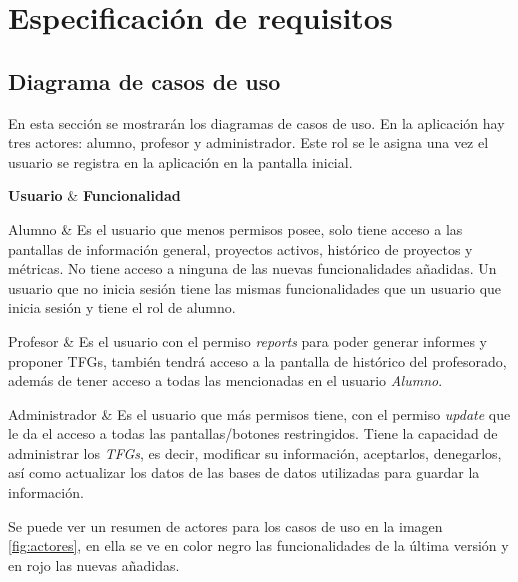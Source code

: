 \section{Especificación de requisitos}

\subsection{Diagrama de casos de uso}
En esta sección se mostrarán los diagramas de casos de uso. En la aplicación hay tres actores: alumno, profesor y administrador.
Este rol se le asigna una vez el usuario se registra en la aplicación en la pantalla inicial. 


{\textbf{Usuario} & \textbf{Funcionalidad} \\}{
	Alumno & Es el usuario que menos permisos posee, solo tiene acceso a las pantallas de información general, proyectos activos, histórico de proyectos y métricas. No tiene acceso a ninguna de las nuevas funcionalidades añadidas. Un usuario que no inicia sesión tiene las mismas funcionalidades que un usuario que inicia sesión y tiene el rol de alumno. \\\hline
	
	Profesor & Es el usuario con el permiso \emph{reports} para poder generar informes y proponer TFGs, también tendrá acceso a la pantalla de histórico del profesorado, además de tener acceso a todas las mencionadas en el usuario \emph{Alumno}. \\\hline
	
	Administrador & Es el usuario que más permisos tiene, con el permiso \emph{update} que le da el acceso a todas las pantallas/botones restringidos. Tiene la capacidad de administrar los \emph{TFGs}, es decir, modificar su información, aceptarlos, denegarlos, así como actualizar los datos de las bases de datos utilizadas para guardar la información. \\
}
Se puede ver un resumen de actores para los casos de uso en la imagen \ref{fig:actores}, en ella se ve en color negro las funcionalidades de la última versión y en rojo las nuevas añadidas.

